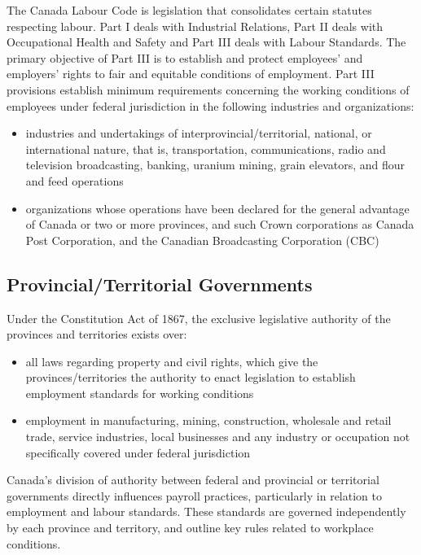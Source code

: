 \documentclass[letterpaper,10pt,english]{sphinxmanual}
\begin{document}
\sphinxAtStartPar
The Canada Labour Code is legislation that consolidates certain statutes respecting labour.
Part I deals with Industrial Relations, Part II deals with Occupational Health and Safety and
Part III deals with Labour Standards. The primary objective of Part III is to establish and
protect employees’ and employers’ rights to fair and equitable conditions of employment.
Part III provisions establish minimum requirements concerning the working conditions of
employees under federal jurisdiction in the following industries and organizations:
\begin{itemize}
\item {} 
\sphinxAtStartPar
industries and undertakings of inter\sphinxhyphen{}provincial/territorial, national, or international nature, that is, transportation, communications, radio and television broadcasting, banking, uranium mining, grain elevators, and flour and feed operations

\item {} 
\sphinxAtStartPar
organizations whose operations have been declared for the general advantage of Canada or two or more provinces, and such Crown corporations as Canada Post Corporation, and the Canadian Broadcasting Corporation (CBC)

\end{itemize}


\subsection{Provincial/Territorial Governments}
\label{\detokenize{compliance:provincial-territorial-governments}}
\sphinxAtStartPar
Under the Constitution Act of 1867, the exclusive legislative authority of the provinces and
territories exists over:
\begin{itemize}
\item {} 
\sphinxAtStartPar
all laws regarding property and civil rights, which give the provinces/territories the authority to enact legislation to establish employment standards for working conditions

\item {} 
\sphinxAtStartPar
employment in manufacturing, mining, construction, wholesale and retail trade, service industries, local businesses and any industry or occupation not specifically covered under federal jurisdiction

\end{itemize}

\sphinxAtStartPar
Canada’s division of authority between federal and provincial or territorial governments directly influences payroll
practices, particularly in relation to employment and labour standards. These standards are governed independently by
each province and territory, and outline key rules related to workplace conditions.
\end{document}
